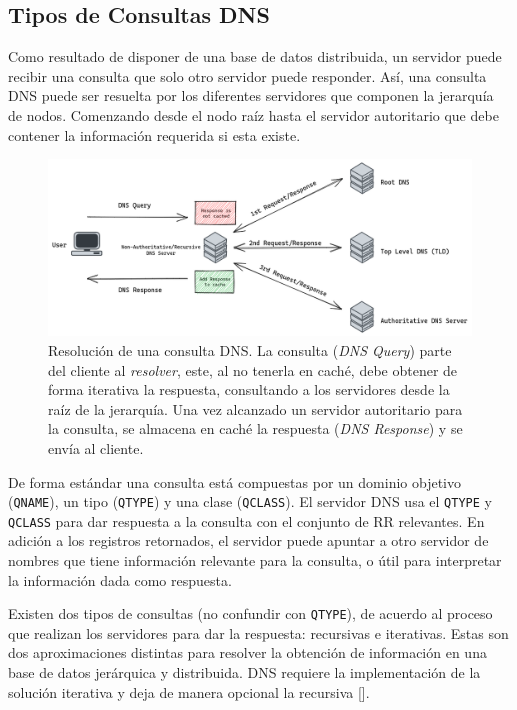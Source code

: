 \subsection{Tipos de Consultas DNS}

Como resultado de disponer de una base de datos distribuida, un servidor puede recibir una consulta que solo otro servidor puede responder. Así, una consulta DNS puede ser resuelta por los diferentes servidores que componen la jerarquía de nodos. Comenzando desde el nodo raíz hasta el servidor autoritario que debe contener la información requerida si esta existe.

\begin{figure}[!ht]
    \centering
    \includegraphics[width=\linewidth]{draws/dns-query.png}
    \caption{Resolución de una consulta DNS. La consulta (\textit{DNS Query}) parte del cliente al \textit{resolver}, este, al no tenerla en caché, debe obtener de forma iterativa la respuesta, consultando a los servidores desde la raíz de la jerarquía. Una vez alcanzado un servidor autoritario para la consulta, se almacena en caché la respuesta (\textit{DNS Response}) y se envía al cliente.}
\end{figure}

De forma estándar una consulta está compuestas por un dominio objetivo (\verb|QNAME|), un tipo (\verb|QTYPE|) y una clase (\verb|QCLASS|). El servidor DNS usa el \verb|QTYPE| y \verb|QCLASS| para dar respuesta a la consulta con el conjunto de RR relevantes. En adición a los registros retornados, el servidor puede apuntar a otro servidor de nombres que tiene información relevante para la consulta, o útil para interpretar la información dada como respuesta.

Existen dos tipos de consultas (no confundir con \verb|QTYPE|), de acuerdo al proceso que realizan los servidores para dar la respuesta: recursivas e iterativas. Estas son dos aproximaciones distintas para resolver la obtención de información en una base de datos jerárquica y distribuida. DNS requiere la implementación de la solución iterativa y deja de manera opcional la recursiva [\cite{rfc_1034}].

